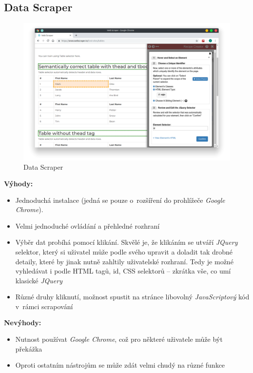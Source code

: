 \documentclass[thesis=B,czech]{FITthesis}[2012/06/26]
\begin{document}
\subsection{Data Scraper}
\begin{figure}[h]
	\includegraphics[width=\linewidth]{images/DataScraper.png}
	\caption{Data Scraper}
	\label{fig:dataScraper}
\end{figure}
\textbf{Výhody:}
\begin{itemize}
	\item Jednoduchá instalace (jedná se pouze o~rozšíření do prohlížeče \emph{Google Chrome}).
	\item Velmi jednoduché ovládání a přehledné rozhraní
	\item Výběr dat probíhá pomocí klikání. Skvělé je, že klikáním se utváří \emph{JQuery} selektor, který si uživatel může podle svého upravit a doladit tak drobné detaily, které by jinak nutně zahltily uživatelské rozhraní. Tedy je možné vyhledávat i podle HTML tagů, id, CSS selektorů -- zkrátka vše, co umí klasické \emph{JQuery}
	\item Různé druhy kliknutí, možnost spustit na stránce libovolný \emph{JavaScriptový} kód v~rámci scrapování
\end{itemize}

\textbf{Nevýhody:}
\begin{itemize}
	\item Nutnost používat \emph{Google Chrome}, což pro některé uživatele může být překážka
	\item Oproti ostatním nástrojům se může zdát velmi chudý na různé funkce
\end{itemize}

\end{document}
